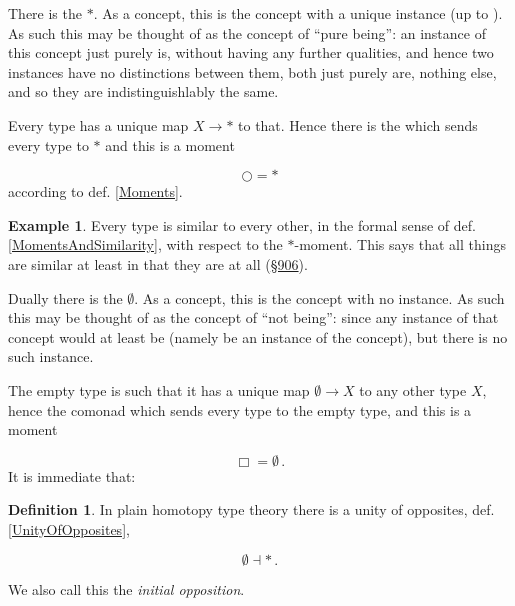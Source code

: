 \documentclass[12pt,titlepage]{article}
\theoremstyle{plain}
\theoremstyle{definition}
\newtheorem{defn}{Definition}
\newtheorem{example}{Example}
\theoremstyle{remark}
\begin{document}
There is the  $\ast$. As a concept, this is the concept with a unique instance (up to ). As such this may be thought of as the concept of ``pure being'': an instance of this concept just purely is, without having any further qualities, and hence two instances have no distinctions between them, both just purely are, nothing else, and so they are indistinguishlably the same.

Every type has a unique map $X\to \ast$ to that. Hence there is the  which sends every type to $\ast$ and this is a moment

\begin{displaymath}
\bigcirc = \ast
\end{displaymath}
according to def. \ref{Moments}.

\begin{example}
\label{SimilarityWithRespectToPureBeing}\hypertarget{SimilarityWithRespectToPureBeing}{}
Every type is similar to every other, in the formal sense of def. \ref{MomentsAndSimilarity}, with respect to the $\ast$-moment. This says that all things are similar at least in that they are at all (\hyperlink{906}{§906}).

\end{example}
Dually there is the  $\emptyset$. As a concept, this is the concept with no instance. As such this may be thought of as the concept of ``not being'': since any instance of that concept would at least be (namely be an instance of the concept), but there is no such instance.

The empty type is such that it has a unique map $\emptyset \to X$ to any other type $X$, hence the comonad which sends every type to the empty type, and this is a moment

\begin{displaymath}
\Box = \emptyset
  \,.
\end{displaymath}
It is immediate that:

\begin{defn}
\label{InitialOpposition}\hypertarget{InitialOpposition}{}
In plain homotopy type theory there is a unity of opposites, def. \ref{UnityOfOpposites},

\begin{displaymath}
\emptyset \dashv \ast
  \,.
\end{displaymath}
\end{defn}
We also call this the \emph{initial opposition}.
\end{document}
